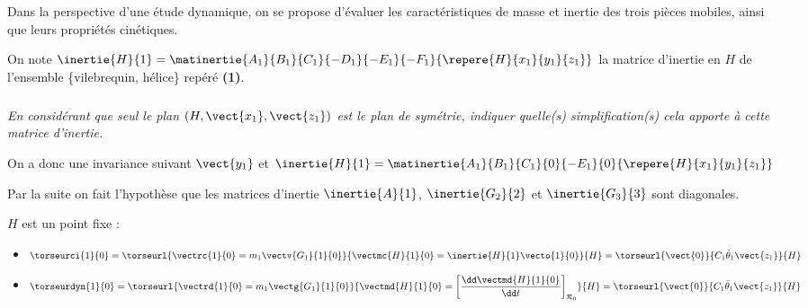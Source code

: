 \begin{multicols}{2}
\begin{corrige}
\end{corrige}
\else
\fi

Dans la perspective d’une étude dynamique, on se propose d’évaluer les caractéristiques de masse et inertie des trois pièces mobiles, ainsi que leurs propriétés cinétiques.

On note $\inertie{H}{1}=\matinertie{A_1}{B_1}{C_1}{-D_1}{-E_1}{-F_1}{\repere{H}{x_1}{y_1}{z_1}}$ la matrice d'inertie en $H$ de l'ensemble \{vilebrequin, hélice\} repéré \textbf{(1)}. 

\subparagraph{}
\textit{En considérant que seul le plan $\left(H,\vect{x_1},\vect{z_1}\right)$ est le plan de symétrie, indiquer quelle(s) simplification(s) cela apporte à cette matrice d'inertie.} 

\ifprof
\begin{corrige}
On a donc une invariance suivant $\vect{y_1}$ et 
$\inertie{H}{1}=\matinertie{A_1}{B_1}{C_1}{0}{-E_1}{0}{\repere{H}{x_1}{y_1}{z_1}}$
\end{corrige}
\else
\fi

%


Par la suite on fait l'hypothèse que les matrices d'inertie $\inertie{A}{1}$, $\inertie{G_2}{2}$ et $\inertie{G_3}{3}$ sont diagonales. 

\ifprof
\begin{corrige}
$H$ est un point fixe : 
\begin{itemize}
\item $\torseurci{1}{0}
=\torseurl{\vectrc{1}{0}=m_1\vectv{G_1}{1}{0}}{\vectmc{H}{1}{0}=\inertie{H}{1}\vecto{1}{0}}{H}
=\torseurl{\vect{0}}{C_1\dot{\theta}_1\vect{z_1}}{H}$
\item $\torseurdyn{1}{0}
=\torseurl{\vectrd{1}{0}=m_1\vectg{G_1}{1}{0}}{\vectmd{H}{1}{0}=\left[\dfrac{\dd \vectmd{H}{1}{0}}{\dd t}\right]_{\mathcal{R}_0}}{H}
=\torseurl{\vect{0}}{C_1\ddot{\theta}_1\vect{z_1}}{H}$
\end{itemize}



\end{corrige}
\end{multicols}
